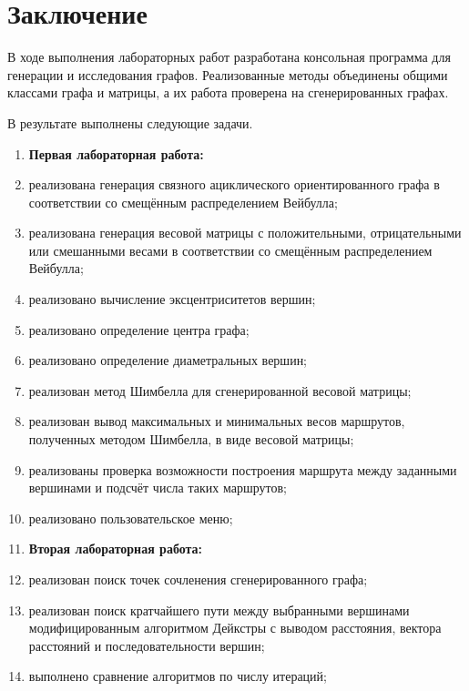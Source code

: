 \section*{Заключение}

В ходе выполнения лабораторных работ разработана консольная программа для генерации и исследования графов. Реализованные методы объединены общими классами графа и матрицы, а их работа проверена на сгенерированных графах.

В результате выполнены следующие задачи.
\begin{enumerate}
    \vspace{1em}
    \item[] \textbf{Первая лабораторная работа:}
    \item реализована генерация связного ациклического ориентированного графа в соответствии со смещённым распределением Вейбулла;
    \item реализована генерация весовой матрицы с положительными, отрицательными или смешанными весами в соответствии со смещённым распределением Вейбулла;
    \item реализовано вычисление эксцентриситетов вершин;
    \item реализовано определение центра графа;
    \item реализовано определение диаметральных вершин;
    \item реализован метод Шимбелла для сгенерированной весовой матрицы;
    \item реализован вывод максимальных и минимальных весов маршрутов, полученных методом Шимбелла, в виде весовой матрицы;
    \item реализованы проверка возможности построения маршрута между заданными вершинами и подсчёт числа таких маршрутов;
    \item реализовано пользовательское меню;

    \vspace{1em}
    \item[] \textbf{Вторая лабораторная работа:}
    \item реализован поиск точек сочленения сгенерированного графа;
    \item реализован поиск кратчайшего пути между выбранными вершинами модифицированным алгоритмом Дейкстры с выводом расстояния, вектора расстояний и последовательности вершин;
    \item выполнено сравнение алгоритмов по числу итераций;


\end{enumerate}

